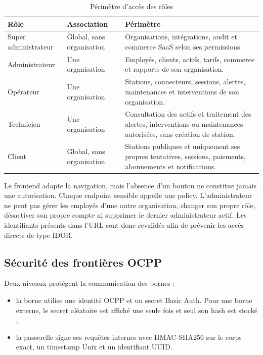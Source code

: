 \begin{table}[H]
  \centering
  \caption{Périmètre d'accès des rôles}
  \label{tab:role-data-scope}
  \begin{tabularx}{\textwidth}{|p{2.8cm}|p{3.3cm}|Y|}
    \hline
    \textbf{Rôle} & \textbf{Association} & \textbf{Périmètre}\\\hline

    Super administrateur & Global, sans organisation &
    Organisations, intégrations, audit et commerce SaaS selon ses permissions.\\\hline
    Administrateur & Une organisation &
    Employés, clients, actifs, tarifs, commerce et rapports de son organisation.\\\hline
    Opérateur & Une organisation &
    Stations, connecteurs, sessions, alertes, maintenances et interventions de son
    organisation.\\\hline
    Technicien & Une organisation &
    Consultation des actifs et traitement des alertes, interventions ou maintenances
    autorisées, sans création de station.\\\hline
    Client & Global, sans organisation &
    Stations publiques et uniquement ses propres tentatives, sessions, paiements,
    abonnements et notifications.\\\hline

  \end{tabularx}
\end{table}

Le frontend adapte la navigation, mais l'absence d'un bouton ne constitue jamais une
autorisation. Chaque endpoint sensible appelle une policy. L'administrateur ne peut
pas gérer les employés d'une autre organisation, changer son propre rôle, désactiver
son propre compte ni supprimer le dernier administrateur actif. Les identifiants
présents dans l'URL sont donc revalidés afin de prévenir les accès directs de type
IDOR.

\subsection{Sécurité des frontières OCPP}

Deux niveaux protègent la communication des bornes :

\begin{itemize}[leftmargin=7mm]
  \item la borne utilise une identité OCPP et un secret Basic Auth. Pour une borne
  externe, le secret aléatoire est affiché une seule fois et seul son hash est
  stocké ;
  \item la passerelle signe ses requêtes internes avec HMAC-SHA256 sur le corps
  exact, un timestamp Unix et un identifiant UUID.
\end{itemize}

